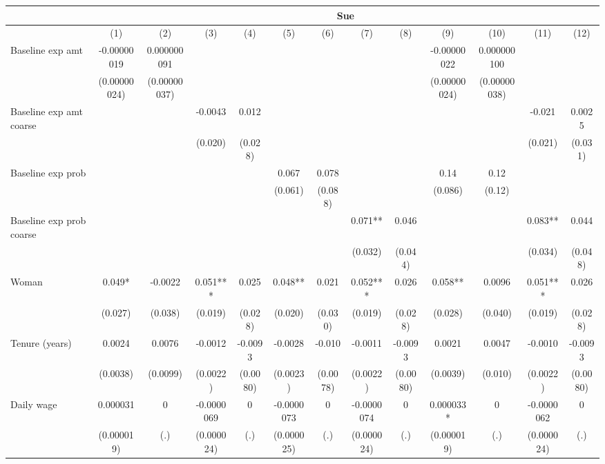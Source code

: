 \begin{tabular}{lcccccccccccc}
\toprule
      & \multicolumn{12}{c}{Sue} \\
\midrule
\midrule
      & (1)   & (2)   & (3)   & (4)   & (5)   & (6)   & (7)   & (8)   & (9)   & (10)  & (11)  & (12) \\
\midrule
\midrule
Baseline exp amt & -0.00000019 & 0.000000091 &       &       &       &       &       &       & -0.00000022 & 0.000000100 &       &  \\
      & (0.00000024) & (0.00000037) &       &       &       &       &       &       & (0.00000024) & (0.00000038) &       &  \\
Baseline exp amt coarse &       &       & -0.0043 & 0.012 &       &       &       &       &       &       & -0.021 & 0.0025 \\
      &       &       & (0.020) & (0.028) &       &       &       &       &       &       & (0.021) & (0.031) \\
Baseline exp prob &       &       &       &       & 0.067 & 0.078 &       &       & 0.14  & 0.12  &       &  \\
      &       &       &       &       & (0.061) & (0.088) &       &       & (0.086) & (0.12) &       &  \\
Baseline exp prob coarse &       &       &       &       &       &       & 0.071** & 0.046 &       &       & 0.083** & 0.044 \\
      &       &       &       &       &       &       & (0.032) & (0.044) &       &       & (0.034) & (0.048) \\
Woman & 0.049* & -0.0022 & 0.051*** & 0.025 & 0.048** & 0.021 & 0.052*** & 0.026 & 0.058** & 0.0096 & 0.051*** & 0.026 \\
      & (0.027) & (0.038) & (0.019) & (0.028) & (0.020) & (0.030) & (0.019) & (0.028) & (0.028) & (0.040) & (0.019) & (0.028) \\
Tenure (years) & 0.0024 & 0.0076 & -0.0012 & -0.0093 & -0.0028 & -0.010 & -0.0011 & -0.0093 & 0.0021 & 0.0047 & -0.0010 & -0.0093 \\
      & (0.0038) & (0.0099) & (0.0022) & (0.0080) & (0.0023) & (0.0078) & (0.0022) & (0.0080) & (0.0039) & (0.010) & (0.0022) & (0.0080) \\
Daily wage & 0.000031 & 0     & -0.0000069 & 0     & -0.0000073 & 0     & -0.0000074 & 0     & 0.000033* & 0     & -0.0000062 & 0 \\
      & (0.000019) & (.)   & (0.000024) & (.)   & (0.000025) & (.)   & (0.000024) & (.)   & (0.000019) & (.)   & (0.000024) & (.) \\

\end{tabular}
